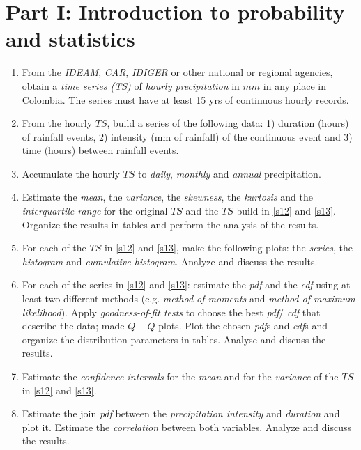 \documentclass[10pt, a4paper]{exam}
\begin{document}
\section{Part I: Introduction to probability and statistics  }
\begin{enumerate}

    \item \label{s11} From the \emph{IDEAM}, \emph{CAR}, \emph{IDIGER} or other national or regional agencies, obtain a \emph{time series (TS)} of \emph{hourly precipitation} in $mm$ in any place in Colombia.  The series must have at least 15 yrs of continuous hourly records. 

    \item \label{s12} From the hourly $TS$, build a series of the following data: 1)  duration (hours) of rainfall events, 2) intensity (mm of rainfall) of the continuous event and 3) time (hours) between rainfall events. 

\item \label{s13} Accumulate the hourly $TS$ to \emph{daily}, \emph{monthly} and \emph{annual} precipitation.

\item Estimate the \emph{mean}, the \emph{variance}, the \emph{skewness}, the \emph{kurtosis} and the \emph{interquartile range} for the original $TS$ and the $TS$ build in \ref{s12} and \ref{s13}.  Organize the results in tables and perform the analysis of the results.

\item For each of the $TS$ in \ref{s12} and \ref{s13}, make the following plots: the \emph{series}, the \emph{histogram} and \emph{cumulative histogram}. Analyze and discuss the results.

\item For each of the series in \ref{s12} and \ref{s13}: estimate the \emph{pdf}  and the \emph{cdf} using at least two different methods (e.g. \emph{method of moments} and \emph{method of maximum likelihood}). Apply \emph{goodness-of-fit tests} to choose the best \emph{pdf}/ \emph{cdf} that describe the data; made $Q-Q$ plots.  Plot the chosen \emph{pdf}s and \emph{cdf}s and  organize the distribution parameters in tables. Analyse and discuss the results. 

\item Estimate the \emph{confidence intervals} for the \emph{mean} and for the \emph{variance} of the $TS$ in \ref{s12} and \ref{s13}.  

\item Estimate the join \emph{pdf} between the \emph{precipitation intensity} and \emph{duration} and plot it. Estimate the \emph{correlation} between both variables. Analyze and discuss the results.

\end{enumerate}
\end{document}
